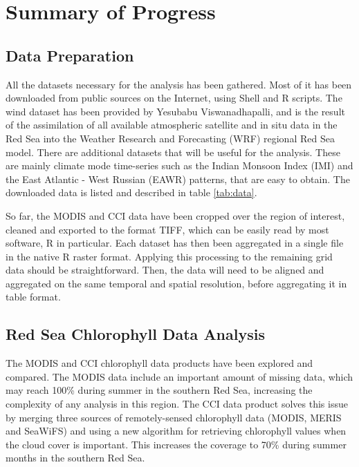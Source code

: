 \chapter{Summary of Progress}

\section{Data Preparation}

All the datasets necessary for the analysis has been gathered. Most of it has
been downloaded from public sources on the Internet, using Shell and R scripts.
The wind dataset has been provided by Yesubabu Viswanadhapalli, and is the
result of the assimilation of all available atmospheric satellite and in situ
data in the Red Sea into the Weather Research and Forecasting (WRF) regional
Red Sea model. There are additional datasets that will be useful for the
analysis. These are mainly climate mode time-series such as the Indian Monsoon
Index (IMI) and the East Atlantic - West Russian (EAWR) patterns, that are easy
to obtain. The downloaded data is listed and described in table \ref{tab:data}.

So far, the MODIS and CCI data have been cropped over the region of interest,
cleaned and exported to the format TIFF, which can be easily read by most
software, R in particular. Each dataset has then been aggregated in a single
file in the native R raster format. Applying this processing to the remaining
grid data should be straightforward. Then, the data will need to be aligned
and aggregated on the same temporal and spatial resolution, before aggregating
it in table format.



\section{Red Sea Chlorophyll Data Analysis}

The MODIS and CCI chlorophyll data products have been explored and compared.
The MODIS data include an important amount of missing data, which may reach
100\% during summer in the southern Red Sea, increasing the complexity of any
analysis in this region. The CCI data product solves this issue by merging
three sources of remotely-sensed chlorophyll data (MODIS, MERIS and SeaWiFS)
and using a new algorithm for retrieving chlorophyll values when the cloud
cover is important.  This increases the coverage to 70\% during summer months
in the southern Red Sea.

